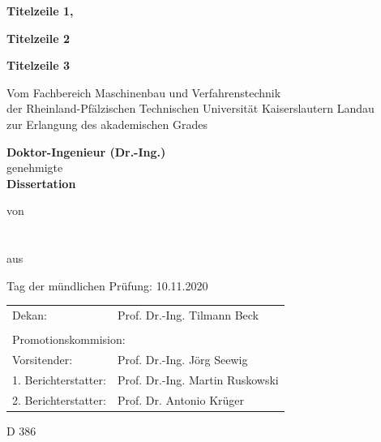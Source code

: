 
\begin{titlepage}

\begin{center}

 \vspace*{1cm}

 \textbf{\Huge Titelzeile 1,}

 \textbf{\Huge Titelzeile 2}

 \textbf{\Huge Titelzeile 3}

 \vspace{2cm}


 Vom Fachbereich Maschinenbau und Verfahrenstechnik \\[6pt]
 der Rheinland-Pfälzischen Technischen Universität Kaiserslautern Landau \\[6pt]
 zur Erlangung des akademischen Grades\\[6pt]
 
 \vfill
 
 \textbf{Doktor-Ingenieur (Dr.-Ing.)}\\[6pt]
 genehmigte\\[6pt]

 \textbf{Dissertation}

 \vfill

 von \\[4pt]
 \Geschlecht\\[4pt]
 \textbf{\AkGrad~ \Name} \\[6pt]
 aus \Geburtsort

 \vfill

Tag der mündlichen Prüfung: 10.11.2020
\end{center}
 \vfill


\begin{tabular}{ll}
Dekan:               & Prof. Dr.-Ing. Tilmann Beck     \\
\\
\multicolumn{2}{l}{Promotionskommision:}               \\
Vorsitender:         & Prof. Dr.-Ing. Jörg Seewig      \\
1. Berichterstatter: & Prof. Dr.-Ing. Martin Ruskowski \\
2. Berichterstatter: & Prof. Dr. Antonio Krüger       \\
\end{tabular}

\begin{center}
D 386
\end{center}
\end{titlepage}
\pagestyle{empty}
\cleardoublepage
\pagestyle{headings}

